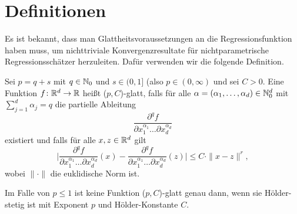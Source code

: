 \section{Definitionen}
Es ist bekannt, dass man Glattheitsvoraussetzungen an die Regressionsfunktion haben muss, um nichttriviale Konvergenzresultate für nichtparametrische Regressionsschätzer herzuleiten. Dafür verwenden wir die folgende Definition.
\begin{defn}[($p,C$)-Glattheit]
\label{def:pc}
   Sei $p = q + s$ mit $q \in \mathbb{N}_0$ und $s \in (0,1]$ (also $p \in (0, \infty)$ und sei $C > 0$. Eine Funktion $f\colon \mathbb{R}^d \to \mathbb{R}$ heißt ($p, C$)-glatt, falls für alle $\alpha = (\alpha_1,\dots,\alpha_d) \in \mathbb{N}_0^d$ mit $\sum_{j = 1}^{d}\alpha_j = q$ die partielle Ableitung 
   $$ \frac{\partial^qf}{\partial x_1^{\alpha_1}\dots\partial x_d^{\alpha_d}}$$
   existiert und falls für alle $x, z \in \mathbb{R}^d$ gilt
   $$ \bigg|\frac{\partial^qf}{\partial x_1^{\alpha_1}\dots\partial x_d^{\alpha_d}}(x) - \frac{\partial^qf}{\partial x_1^{\alpha_1}\dots\partial x_d^{\alpha_d}}(z) \bigg| \leq C \cdot \|x - z\|^r,$$
   wobei $\|\cdot\|$ die euklidische Norm ist.  
\end{defn}
\begin{bemnumber}
Im Falle von $p \leq 1$ ist keine Funktion ($p, C$)-glatt genau dann, wenn sie Hölder-stetig ist mit Exponent $p$ und Hölder-Konstante $C$.
\end{bemnumber}

